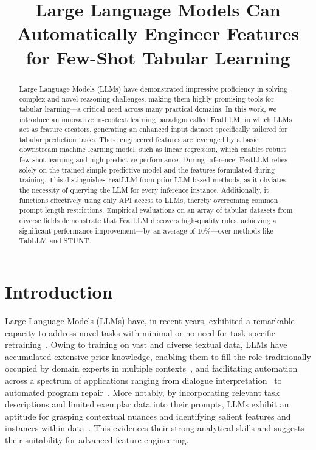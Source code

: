 \title{Large Language Models Can Automatically Engineer Features for Few-Shot Tabular Learning}

\begin{abstract}
Large Language Models (LLMs) have demonstrated impressive proficiency in solving complex and novel reasoning challenges, making them highly promising tools for tabular learning—a critical need across many practical domains. In this work, we introduce an innovative in-context learning paradigm called \textsf{FeatLLM}, in which LLMs act as feature creators, generating an enhanced input dataset specifically tailored for tabular prediction tasks. These engineered features are leveraged by a basic downstream machine learning model, such as linear regression, which enables robust few-shot learning and high predictive performance. During inference, \textsf{FeatLLM} relies solely on the trained simple predictive model and the features formulated during training. This distinguishes \textsf{FeatLLM} from prior LLM-based methods, as it obviates the necessity of querying the LLM for every inference instance. Additionally, it functions effectively using only API access to LLMs, thereby overcoming common prompt length restrictions. Empirical evaluations on an array of tabular datasets from diverse fields demonstrate that \textsf{FeatLLM} discovers high-quality rules, achieving a significant performance improvement—by an average of 10\%—over methods like TabLLM and STUNT.
\end{abstract}

\section{Introduction}
Large Language Models (LLMs) have, in recent years, exhibited a remarkable capacity to address novel tasks with minimal or no need for task-specific retraining~\cite{creswell2022selection,imani2023mathprompter,taylor2022galactica}. Owing to training on vast and diverse textual data, LLMs have accumulated extensive prior knowledge, enabling them to fill the role traditionally occupied by domain experts in multiple contexts~\cite{Genomes2021,singhal2023large,wilcox2003role}, and facilitating automation across a spectrum of applications ranging from dialogue interpretation~\cite{finch2023leveraging} to automated program repair~\cite{fan2023automated}. More notably, by incorporating relevant task descriptions and limited exemplar data into their prompts, LLMs exhibit an aptitude for grasping contextual nuances and identifying salient features and instances within data~\cite{brown2020language,zhao2023survey}. This evidences their strong analytical skills and suggests their suitability for advanced feature engineering.


